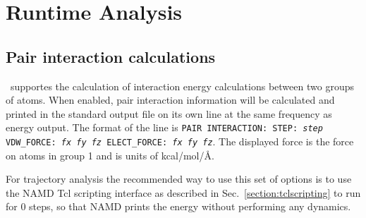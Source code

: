 
\section{Runtime Analysis}
\label{section:analysis}


\subsection{Pair interaction calculations}
\label{section:pairinteraction}
\NAMD\ supportes the calculation of interaction energy calculations between 
two groups of atoms.  When enabled, pair interaction information will be
calculated and printed in the standard output file on its own line at the
same frequency as energy output.  The format of the line is
{\tt PAIR INTERACTION: STEP: {\it step} VDW\_FORCE: {\it fx fy fz} 
ELECT\_FORCE: {\it fx fy fz}}.
The displayed force is the force on atoms in group 1 and is units of 
kcal/mol/\AA. 

For trajectory analysis the 
recommended way to use this set of options is to use the NAMD Tcl scripting 
interface as described in Sec.~\ref{section:tclscripting} to run for
0 steps, so that NAMD prints the energy without performing any dynamics.

